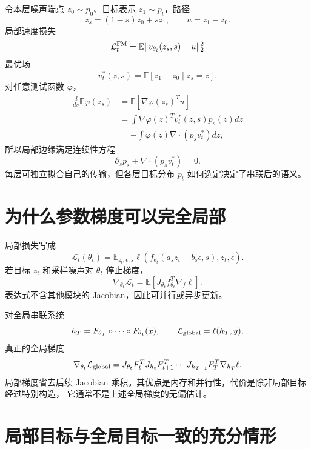 \documentclass[11pt]{article}
\numberwithin{equation}{section}
\newcommand{\E}{\mathbb{E}}
\newcommand{\1}{\mathbf{1}}
\newcommand{\cL}{\mathcal{L}}
\begin{document}
令本层噪声端点 $z_0\sim p_0$、目标表示 $z_1\sim p_t$，路径
\begin{equation}
 z_s=(1-s)z_0+sz_1,\qquad u=z_1-z_0.
\end{equation}
局部速度损失
\begin{equation}
 \cL_t^{\rm FM}=\E\|v_{\theta_t}(z_s,s)-u\|_2^2
\end{equation}
最优场
\begin{equation}
 v_t^*(z,s)=\E[z_1-z_0\mid z_s=z].
\end{equation}
对任意测试函数 $\varphi$，
\begin{align}
 \frac d{ds}\E\varphi(z_s)
 &=\E[\nabla\varphi(z_s)^Tu]\\
 &=\int\nabla\varphi(z)^Tv_t^*(z,s)p_s(z)dz\\
 &=-\int\varphi(z)\nabla\cdot(p_sv_t^*)dz,
\end{align}
所以局部边缘满足连续性方程
\begin{equation}
 \partial_sp_s+\nabla\cdot(p_sv_t^*)=0.
\end{equation}
每层可独立拟合自己的传输，但各层目标分布 $p_t$ 如何选定决定了串联后的语义。

\section{为什么参数梯度可以完全局部}

局部损失写成
\begin{equation}
 \cL_t(\theta_t)=\E_{z_t,\epsilon,s}
 \ell(f_{\theta_t}(a_sz_t+b_s\epsilon,s),z_t,\epsilon).
\end{equation}
若目标 $z_t$ 和采样噪声对 $\theta_t$ 停止梯度，
\begin{equation}
 \nabla_{\theta_t}\cL_t
 =\E[J_{\theta_t}f_{\theta_t}^T\nabla_f\ell].
\end{equation}
表达式不含其他模块的 Jacobian，因此可并行或异步更新。

对全局串联系统
\begin{equation}
 h_T=F_{\theta_T}\circ\cdots\circ F_{\theta_1}(x),
 \qquad \cL_{\rm global}=\ell(h_T,y),
\end{equation}
真正的全局梯度
\begin{equation}
 \nabla_{\theta_t}\cL_{\rm global}
 =J_{\theta_t}F_t^T
 J_{h_t}F_{t+1}^T\cdots J_{h_{T-1}}F_T^T
 \nabla_{h_T}\ell.
\end{equation}
局部梯度省去后续 Jacobian 乘积。其优点是内存和并行性，代价是除非局部目标经过特别构造，
它通常不是上述全局梯度的无偏估计。

\section{局部目标与全局目标一致的充分情形}
\end{document}
